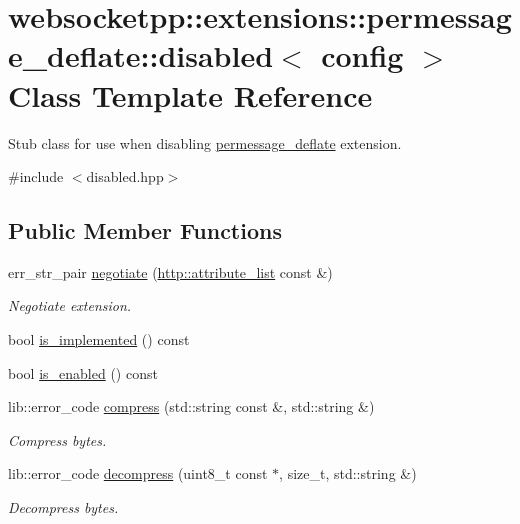 \hypertarget{classwebsocketpp_1_1extensions_1_1permessage__deflate_1_1disabled}{}\section{websocketpp\+:\+:extensions\+:\+:permessage\+\_\+deflate\+:\+:disabled$<$ config $>$ Class Template Reference}
\label{classwebsocketpp_1_1extensions_1_1permessage__deflate_1_1disabled}


Stub class for use when disabling \hyperlink{namespacewebsocketpp_1_1extensions_1_1permessage__deflate}{permessage\+\_\+deflate} extension.  




{\ttfamily \#include $<$disabled.\+hpp$>$}

\subsection*{Public Member Functions}
\begin{DoxyCompactItemize}
\item 
err\+\_\+str\+\_\+pair \hyperlink{classwebsocketpp_1_1extensions_1_1permessage__deflate_1_1disabled_a3de3aad5ffeef60e3713cc29dec7b140}{negotiate} (\hyperlink{namespacewebsocketpp_1_1http_a9744f4104772b987aa9e86c35ce1357b}{http\+::attribute\+\_\+list} const \&)
\begin{DoxyCompactList}\small\item\em Negotiate extension. \end{DoxyCompactList}\item 
bool \hyperlink{classwebsocketpp_1_1extensions_1_1permessage__deflate_1_1disabled_a2471ea045dfff17b36effd61319fc87a}{is\+\_\+implemented} () const
\item 
bool \hyperlink{classwebsocketpp_1_1extensions_1_1permessage__deflate_1_1disabled_a821b1f5929e8330e24e792e0d3ac98a9}{is\+\_\+enabled} () const
\item 
lib\+::error\+\_\+code \hyperlink{classwebsocketpp_1_1extensions_1_1permessage__deflate_1_1disabled_a3ef2c3020ea3b8d531d3cee03bf8eadf}{compress} (std\+::string const \&, std\+::string \&)
\begin{DoxyCompactList}\small\item\em Compress bytes. \end{DoxyCompactList}\item 
lib\+::error\+\_\+code \hyperlink{classwebsocketpp_1_1extensions_1_1permessage__deflate_1_1disabled_ad72b694d8ce4c7e39c055ee2008810b6}{decompress} (uint8\+\_\+t const $\ast$, size\+\_\+t, std\+::string \&)
\begin{DoxyCompactList}\small\item\em Decompress bytes. \end{DoxyCompactList}\end{DoxyCompactItemize}


